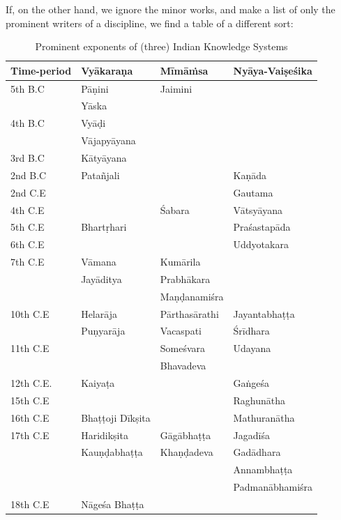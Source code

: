 If, on the other hand, we ignore the minor works, and make a list of only the prominent writers of a discipline, we find a table of a different sort: 
\begin{table}[H]
\centering
\tabcolsep=3pt
\renewcommand{\arraystretch}{1.2}
\begin{tabular}{|l|l|l|l|}
\hline
\textbf{Time-period} & \textbf{Vyākaraṇa} & \textbf{Mīmāṁsa} & \textbf{Nyāya-Vaiṣeśika}\\\hline
5th B.C & Pāṇini &  Jaimini  & \\\hline
& Yāska & & \\\hline
4th B.C & Vyāḍi & & \\\hline
& Vājapyāyana & & \\\hline
3rd B.C & Kātyāyana & & \\\hline
2nd B.C & Patañjali & & Kaṇāda\\\hline
2nd C.E & & & Gautama\\\hline
4th C.E & & Śabara & Vātsyāyana\\\hline
5th C.E & Bhartṛhari & & Praśastapāda\\\hline
6th C.E& & & Uddyotakara\\\hline
7th C.E & Vāmana & Kumārila & \\\hline
& Jayāditya & Prabhākara & \\\hline
& & Maṇḍanamiśra & \\\hline
10th C.E & Helarāja & Pārthasārathi & Jayantabhaṭṭa\\\hline
 & Puṇyarāja & Vacaspati & Śrīdhara\\\hline
11th C.E & & Someśvara & Udayana\\\hline
& & Bhavadeva & \\\hline
12th C.E. & Kaiyaṭa & & Gaṅgeśa\\\hline
15th C.E & & & Raghunātha\\\hline
16th C.E & Bhaṭṭoji Dīkṣita & & Mathuranātha\\\hline
17th C.E & Haridikṣita & Gāgābhaṭṭa & Jagadīśa\\\hline
& Kauṇḍabhaṭṭa & Khaṇḍadeva & Gadādhara\\\hline
& & & Annambhaṭṭa\\\hline
& & & Padmanābhamiśra\\\hline
18th C.E  & Nāgeśa Bhaṭṭa & & \\\hline
\end{tabular}
\caption{Prominent exponents of (three) Indian Knowledge Systems}\label{chap2-tab1}
\end{table}

